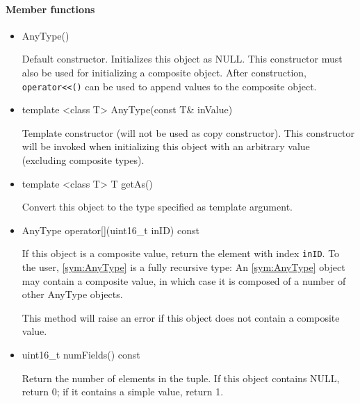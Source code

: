\paragraph{Member functions}

\begin{itemize}
	\item
		\begin{cppsnippet}
		AnyType()
		\end{cppsnippet}

		Default constructor. Initializes this object as NULL. This constructor must also be used for initializing a composite object. After construction, \texttt{operator<\/<()} can be used to append values to the composite object.

	\item
		\begin{cppsnippet}
		template <class T> AnyType(const T& inValue)
		\end{cppsnippet}
		
		Template constructor (will not be used as copy constructor). This constructor will be invoked when initializing this object with an arbitrary value (excluding composite types).

	\item
		\begin{cppsnippet}
		template <class T> T getAs()
		\end{cppsnippet}
		
		Convert this object to the type specified as template argument.

	\item
		\begin{cppsnippet}
		AnyType operator[](uint16_t inID) const
		\end{cppsnippet}
		
		If this object is a composite value, return the element with index \texttt{inID}. To the user, \ref{sym:AnyType} is a fully recursive type: An \ref{sym:AnyType} object may contain a composite value, in which case it is composed of a number of other AnyType objects.
		
		This method will raise an error if this object does not contain a composite value.

	\item
		\begin{cppsnippet}
		uint16_t numFields() const
		\end{cppsnippet}

		Return the number of elements in the tuple. If this object contains NULL, return 0; if it contains a simple value, return 1.


\end{itemize}
